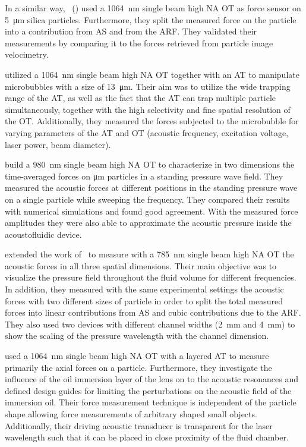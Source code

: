 In a similar way, ~(\citeyear{Bassindale2014}) used a 
\SI{1064}{\nm} single beam high NA OT as force sensor on \SI{5}{\um} silica 
particles. Furthermore, they split the measured force on the particle into a 
contribution from AS and from the ARF. They validated their measurements by 
comparing it to the forces retrieved from particle image velocimetry.

 utilized a \SI{1064}{\nm} single beam high NA OT together with 
an AT to manipulate microbubbles with a size of \SI{13}{\um}. Their aim was to 
utilize the wide trapping range of the AT, as well as the fact that the AT can 
trap multiple particle simultaneously, together with the high selectivity and 
fine spatial resolution of the OT. Additionally, they measured the forces 
subjected to the microbubble for varying parameters of the AT and OT (acoustic 
frequency, excitation voltage, laser power, beam diameter).

 build a \SI{980}{\nm} single beam high NA OT to 
characterize in two dimensions the time-averaged forces on \si{\um} particles 
in a standing pressure wave field. They measured the acoustic forces at 
different positions in the standing pressure wave on a single particle while 
sweeping the frequency. They compared their results with numerical simulations 
and found good agreement. With the measured force amplitudes they were also 
able to approximate the acoustic pressure inside the acoustofluidic device.

 extended the work of~\cite{Lakaemper2015} to measure with 
a \SI{785}{\nm} single beam high NA OT the acoustic forces in all three spatial 
dimensions. Their main objective was to visualize the pressure field throughout 
the fluid volume for different frequencies. In addition, they measured with the 
same experimental settings the acoustic forces with two different sizes of 
particle in order to split the total measured forces into linear contributions 
from AS and cubic contributions due to the ARF. They also used two devices with 
different channel widths (\SI{2}{\mm} and \SI{4}{\mm}) to show the scaling of 
the pressure wavelength with the channel dimension.

 used a \SI{1064}{\nm} single beam high NA OT with a 
layered AT to measure primarily the axial forces on a particle. Furthermore, 
they investigate the influence of the oil immersion layer of the lens on to the 
acoustic resonances and defined design guides for limiting the perturbations on 
the acoustic field of the immersion oil. Their force measurement technique is 
independent of the particle shape allowing force measurements of arbitrary 
shaped small objects. Additionally, their driving acoustic transducer is 
transparent for the laser wavelength such that it can be placed in close 
proximity of the fluid chamber.


